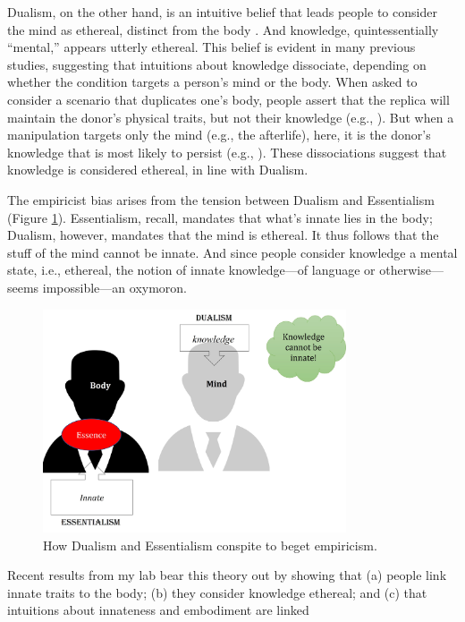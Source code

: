 \documentclass[output=paper,colorlinks,citecolor=brown
]{langscibook}
\begin{document}
Dualism, on the other hand, is an intuitive belief that leads people to consider the mind as ethereal, distinct from the body \citep{bloom2005descartes}. And knowledge, quintessentially “mental,” appears utterly ethereal. This belief is evident in many previous studies, suggesting that intuitions about knowledge dissociate, depending on whether the condition targets a person’s mind or the body. When asked to consider a scenario that duplicates one’s body, people assert that the replica will maintain the donor’s physical traits, but not their knowledge (e.g., \cite{hood2012children}). But when a manipulation targets only the mind (e.g., the afterlife), here, it is the donor’s knowledge that is most likely to persist (e.g., \cite{bering2004natural}). These dissociations suggest that knowledge is considered ethereal, in line with Dualism.

The empiricist bias arises from the tension between Dualism and Essentialism (Figure \ref{fig:figure2}). Essentialism, recall, mandates that what’s innate lies in the body; Dualism, however, mandates that the mind is ethereal. It thus follows that the stuff of the mind cannot be innate. And since people consider knowledge a mental state, i.e., ethereal, the notion of innate knowledge—of language or otherwise—seems impossible—an oxymoron. 

\begin{figure}
    \centering
    \includegraphics[width=0.8\textwidth,keepaspectratio]{figures/berent_figure2.jpg}
    \caption{How Dualism and Essentialism conspite to beget empiricism. }
    \label{fig:figure2}
\end{figure}

Recent results from my lab bear this theory out by showing that (a) people link innate traits to the body; (b) they consider knowledge ethereal; and (c) that intuitions about innateness and embodiment are linked \citep{berent2021can,berent2020essentialist,berent2021empiricism,berent2021essentialist,berent2021public,berent2021true}
\end{document}
